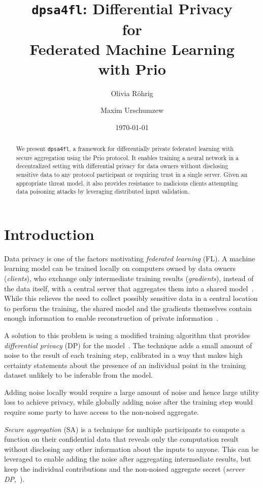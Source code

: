 \documentclass{article}
\title{\texttt{dpsa4fl}: Differential Privacy \\ for \\ Federated Machine
  Learning \\ with Prio}
\author{Olivia R\"ohrig  \\
	\and
	Maxim Urschumzew \\
	}
\date{\today}
\begin{document}
\maketitle


\begin{abstract}
We present \texttt{dpsa4fl}, a framework for differentially private federated
learning with secure aggregation using the Prio protocol. It enables training a
neural network in a decentralized setting with differential privacy for data
owners without disclosing sensitive data to any protocol participant or
requiring trust in a single server. Given an appropriate threat model, it also
provides resistance to malicious clients attempting data poisoning attacks by
leveraging distributed input validation.
\end{abstract}

\section{Introduction}
Data privacy is one of the factors motivating \emph{federated learning} (FL). A
machine learning model can be trained locally on computers owned by data owners
(\emph{clients}), who exchange only intermediate training results
(\emph{gradients}), instead of the data itself, with a central server that
aggregates them into a shared model~\cite{McMahan2016CommunicationEfficientLO}.
While this relieves the need to collect possibly sensitive data in a central
location to perform the training, the shared model and the gradients themselves
contain enough information to enable reconstruction of private
information~\cite{7958568,Boenisch2021WhenTC}.

A solution to this problem is using a modified training algorithm that provides
\emph{differential privacy} (DP) for the model~\cite{Abadi_2016}. The technique adds
a small amount of noise to the result of each training step, calibrated in a way
that makes high certainty statements about the presence of an individual point
in the training dataset unlikely to be inferable from the model.

Adding noise locally would require a large amount of noise and hence large
utility loss to achieve privacy, while globally adding noise after the training
step would require some party to have access to the non-noised aggregate.

\emph{Secure aggregation} (SA) is a technique for multiple
participants to compute a function on their confidential data that reveals only
the computation result without disclosing any other information about the
inputs to anyone. This can be leveraged to enable adding the noise after aggregating
intermediate results, but keep the individual contributions and the non-noised
aggregate secret (\emph{server DP},~\cite{dprio}).
\end{document}
